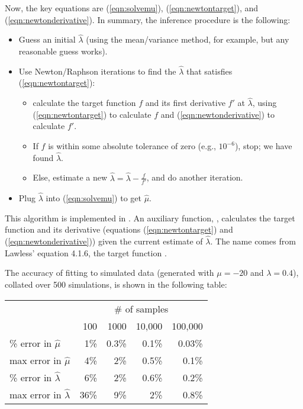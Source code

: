 Now, the key equations are (\ref{eqn:solvemu}),
(\ref{eqn:newtontarget}), and (\ref{eqn:newtonderivative}). In
summary, the inference procedure is the following:

\begin{itemize}
\item Guess an initial $\hat{\lambda}$ (using the mean/variance
  method, for example, but any reasonable guess works).
\item Use Newton/Raphson iterations to find the $\hat{\lambda}$ that satisfies
      (\ref{eqn:newtontarget}):
	\begin{itemize}
	\item calculate the target function $f$ and 
         its first derivative $f'$ at $\hat{\lambda}$, using 
	(\ref{eqn:newtontarget}) to calculate $f$ and 
	(\ref{eqn:newtonderivative}) to calculate $f'$.
	\item If $f$ is within some absolute tolerance of zero 
	(e.g., $10^{-6}$), stop; we have found $\hat{\lambda}$.
	\item Else, estimate a new $\hat{\lambda} = \hat{\lambda} - \frac{f}{f'}$,
	  and do another iteration.
	\end{itemize}
\item Plug $\hat{\lambda}$ into (\ref{eqn:solvemu}) to get $\hat{\mu}$.
\end{itemize}

This algorithm is implemented in .  An
auxiliary function, , calculates the target
function and its derivative (equations (\ref{eqn:newtontarget}) and
(\ref{eqn:newtonderivative})) given the current estimate of
$\hat{\lambda}$.  The name comes from Lawless' equation 4.1.6, the
target function \citep{Lawless82}.

The accuracy of fitting to simulated data (generated with $\mu=-20$
and $\lambda=0.4$), collated over 500 simulations, is shown in the
following table:

\begin{center}
\begin{tabular}{lrrrr} \hline
                              & \multicolumn{4}{c}{\# of samples}\\
                              & 100 & 1000  & 10,000 & 100,000 \\
\% error in $\hat{\mu}$       &  1\%& 0.3\% &  0.1\% & 0.03\%  \\
max error in $\hat{\mu}$      &  4\%&   2\% &  0.5\% &  0.1\%  \\
\% error in $\hat{\lambda}$   &  6\%&   2\% &  0.6\% &  0.2\%  \\
max error in $\hat{\lambda}$  & 36\%&   9\% &    2\% &  0.8\%  \\ \hline
\end{tabular}
\end{center}

